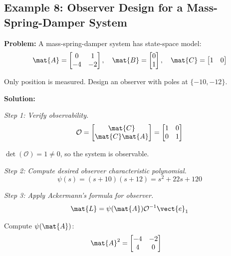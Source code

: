 \subsection{Example 8: Observer Design for a Mass-Spring-Damper System}

\textbf{Problem:} A mass-spring-damper system has state-space model:
\begin{equation}
\mat{A} = \begin{bmatrix} 0 & 1 \\ -4 & -2 \end{bmatrix}, \quad
\mat{B} = \begin{bmatrix} 0 \\ 1 \end{bmatrix}, \quad
\mat{C} = \begin{bmatrix} 1 & 0 \end{bmatrix}
\end{equation}

Only position is measured. Design an observer with poles at $\{-10, -12\}$.

\textbf{Solution:}

\textit{Step 1: Verify observability.}
\begin{equation}
\mathcal{O} = \begin{bmatrix} \mat{C} \\ \mat{C}\mat{A} \end{bmatrix}
= \begin{bmatrix} 1 & 0 \\ 0 & 1 \end{bmatrix}
\end{equation}

$\det(\mathcal{O}) = 1 \neq 0$, so the system is observable.

\textit{Step 2: Compute desired observer characteristic polynomial.}
\begin{equation}
\psi(s) = (s+10)(s+12) = s^2 + 22s + 120
\end{equation}

\textit{Step 3: Apply Ackermann's formula for observer.}
\begin{equation}
\mat{L} = \psi(\mat{A})\mathcal{O}^{-1}\vect{e}_1
\end{equation}

Compute $\psi(\mat{A})$:
\begin{align}
\mat{A}^2 &= \begin{bmatrix} -4 & -2 \\ 4 & 0 \end{bmatrix}
\end{align}

